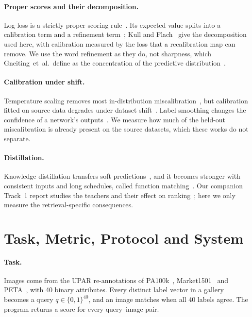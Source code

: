 \documentclass[10pt,twocolumn,letterpaper]{article}
\newcommand{\etal}{et~al.}
\begin{document}
\paragraph{Proper scores and their decomposition.} Log-loss is a strictly proper scoring rule~\cite{gneiting}. Its expected value splits into a calibration term and a refinement term~\cite{degroot,brocker}; Kull and Flach~\cite{kull} give the decomposition used here, with calibration measured by the loss that a recalibration map can remove. We use the word refinement as they do, not sharpness, which Gneiting~\etal\ define as the concentration of the predictive distribution~\cite{gneitingsharp}.

\paragraph{Calibration under shift.} Temperature scaling removes most in-distribution miscalibration~\cite{guo}, but calibration fitted on source data degrades under dataset shift~\cite{ovadia}. Label smoothing changes the confidence of a network's outputs~\cite{muller}. We measure how much of the held-out miscalibration is already present on the source datasets, which these works do not separate.

\paragraph{Distillation.} Knowledge distillation transfers soft predictions~\cite{hinton}, and it becomes stronger with consistent inputs and long schedules, called function matching~\cite{patient}. Our companion Track~1 report studies the teachers and their effect on ranking~\cite{track1}; here we only measure the retrieval-specific consequences.

\section{Task, Metric, Protocol and System}
\label{sec:task}

\paragraph{Task.} Images come from the UPAR re-annotations of PA100k~\cite{pa100k}, Market1501~\cite{market} and PETA~\cite{peta}, with 40 binary attributes. Every distinct label vector in a gallery becomes a query $q\in\{0,1\}^{40}$, and an image matches when all 40 labels agree. The program returns a score for every query--image pair.
\end{document}
